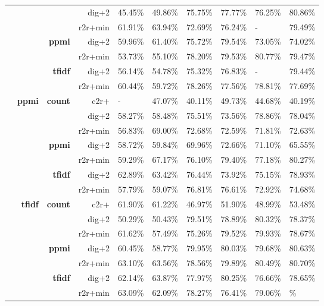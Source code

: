 \begin{table}
{\begin{tabular}{rrrrllllll}
	 &  &  & {dig+2} & 45.45\% & 49.86\% & 75.75\% & 77.77\% & 76.25\% & 80.86\% \\
	 &  &  & {r2r+min} & 61.91\% & 63.94\% & 72.69\% & 76.24\% & - & 79.49\% \\
	\cline{3-4}
	 &  & \multirow[t]{2}{*}{\textbf{ppmi}} & {dig+2} & 59.96\% & 61.40\% & 75.72\% & 79.54\% & 73.05\% & 74.02\% \\
	 &  &  & {r2r+min} & 53.73\% & 55.10\% & 78.20\% & 79.53\% & 80.77\% & 79.47\% \\
	\cline{3-4}
	 &  & \multirow[t]{2}{*}{\textbf{tfidf}} & {dig+2} & 56.14\% & 54.78\% & 75.32\% & 76.83\% & - & 79.44\% \\
	 &  &  & {r2r+min} & 60.44\% & 59.72\% & 78.26\% & 77.56\% & 78.81\% & 77.69\% \\
	\cline{1-4} \cline{2-4} \cline{3-4}
	\multirow[t]{14}{*}{\textbf{\Smfauhtcsldp}} & \multirow[t]{7}{*}{\textbf{ppmi}} & \multirow[t]{3}{*}{\textbf{count}} & {c2r+} & - & 47.07\% & 40.11\% & 49.73\% & 44.68\% & 40.19\% \\
	 &  &  & {dig+2} & 58.27\% & 58.48\% & 75.51\% & 73.56\% & 78.86\% & 78.04\% \\
	 &  &  & {r2r+min} & 56.83\% & 69.00\% & 72.68\% & 72.59\% & 71.81\% & 72.63\% \\
	\cline{3-4}
	 &  & \multirow[t]{2}{*}{\textbf{ppmi}} & {dig+2} & 58.72\% & 59.84\% & 69.96\% & 72.66\% & 71.10\% & 65.55\% \\
	 &  &  & {r2r+min} & 59.29\% & 67.17\% & 76.10\% & 79.40\% & 77.18\% & 80.27\% \\
	\cline{3-4}
	 &  & \multirow[t]{2}{*}{\textbf{tfidf}} & {dig+2} & 62.89\% & 63.42\% & 76.44\% & 73.92\% & 75.15\% & 78.93\% \\
	 &  &  & {r2r+min} & 57.79\% & 59.07\% & 76.81\% & 76.61\% & 72.92\% & 74.68\% \\
	\cline{2-4} \cline{3-4}
	 & \multirow[t]{7}{*}{\textbf{tfidf}} & \multirow[t]{3}{*}{\textbf{count}} & {c2r+} & 61.90\% & 61.22\% & 46.97\% & 51.90\% & 48.99\% & 53.48\% \\
	 &  &  & {dig+2} & 50.29\% & 50.43\% & 79.51\% & 78.89\% & 80.32\% & 78.37\% \\
	 &  &  & {r2r+min} & 61.62\% & 57.49\% & 75.26\% & 79.52\% & 79.93\% & 78.67\% \\
	\cline{3-4}
	 &  & \multirow[t]{2}{*}{\textbf{ppmi}} & {dig+2} & 60.45\% & 58.77\% & 79.95\% & 80.03\% & 79.68\% & 80.63\% \\
	 &  &  & {r2r+min} & 63.10\% & 63.56\% & 78.56\% & 79.89\% & 80.49\% & 80.70\% \\
	\cline{3-4}
	 &  & \multirow[t]{2}{*}{\textbf{tfidf}} & {dig+2} & 62.14\% & 63.87\% & 77.97\% & 80.25\% & 76.66\% & 78.65\% \\
	 &  &  & {r2r+min} & 63.09\% & 62.09\% & 78.27\% & 76.41\% & 79.06\% & \bst 80.92\% \\
	\bottomrule
	\end{tabular}
	}
\end{table}

